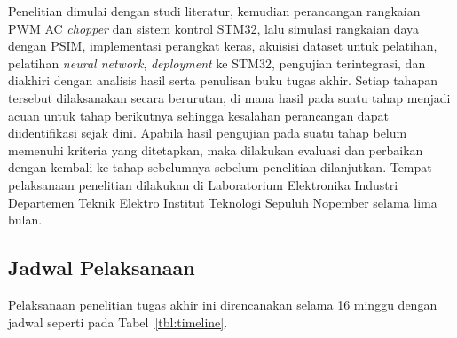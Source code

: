 Penelitian
dimulai dengan studi literatur, kemudian perancangan
rangkaian PWM AC \emph{chopper} dan sistem kontrol
STM32, lalu simulasi rangkaian daya dengan PSIM, implementasi perangkat
keras, akuisisi dataset untuk pelatihan, pelatihan \emph{neural
network}, \emph{deployment} ke STM32, pengujian
terintegrasi, dan diakhiri dengan analisis hasil serta
penulisan buku tugas akhir. Setiap tahapan tersebut
dilaksanakan secara berurutan, di mana hasil pada suatu
tahap menjadi acuan untuk tahap berikutnya sehingga
kesalahan perancangan dapat diidentifikasi sejak dini.
Apabila hasil pengujian pada suatu tahap belum memenuhi
kriteria yang ditetapkan, maka dilakukan evaluasi dan
perbaikan dengan kembali ke tahap sebelumnya sebelum
penelitian dilanjutkan. Tempat pelaksanaan
penelitian dilakukan di Laboratorium Elektronika
Industri Departemen Teknik Elektro Institut
Teknologi Sepuluh Nopember selama lima bulan.

\subsection{Jadwal Pelaksanaan}
\label{sec:jadwal-pelaksanaan}

Pelaksanaan penelitian tugas akhir ini direncanakan selama 16 minggu
dengan jadwal seperti pada Tabel~\ref{tbl:timeline}.

